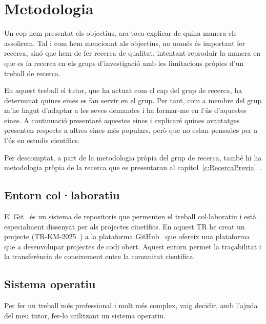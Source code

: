 \chapter{Metodologia}


Un cop hem presentat els objectius, ara toca explicar de quina manera els assolirem. Tal i com hem mencionat als objectius, no només és important fer recerca, sinó que hem de fer recerca de qualitat, intentant reproduir la manera en que es fa recerca en els grups d'investigació amb les limitacions pròpies d'un treball de recerca.

En aquest treball el tutor, que ha actuat com el cap del grup de recerca, ha determinat quines eines es fan servir en el grup. Per tant, com a membre del grup m'he hagut d'adaptar a les seves demandes i ha formar-me en l'ús d'aquestes eines. A continuació presentaré aquestes eines i explicaré quines avantatges presenten respecte a altres eines més populars, però que no estan pensades per a l'ús en estudis científics.

Per descomptat, a part de la metodologia pròpia del grup de recerca, també hi ha metodologia pròpia de la recerca que es presentaran al capítol~\ref{c:RecercaPrevia}~.



\section{Entorn col·laboratiu} \label{sec:Entorn Col·laboratiu}

El Git~\cite{git} és un sistema de repositoris que permenten el treball col$\cdot$laboratiu i està especialment dissenyat per als projectes cinetífics. En aquest TR he creat un projecte (TR-KM-2025~\cite{TR-KM-2025}) a
la plataforma GitHub~\cite{GitHub} que ofereix una plataforma que a desenvolupar projectes de codi obert. Aquest entorn permet la traçabilitat i la transferència de coneixement entre la comunitat científica.


\section{Sistema operatiu}
Per fer un treball més professional i molt més complex, vaig decidir, amb l’ajuda del meu tutor, fer-lo utilitzant un sistema operatiu.

